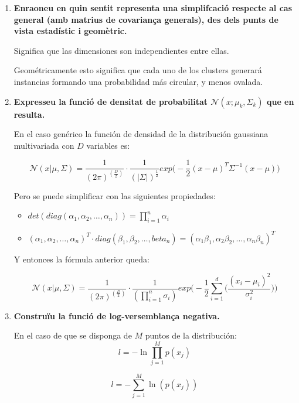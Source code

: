 \documentclass[a5paper]{article}
\begin{document}
\begin{enumerate}
\item \textbf{Enraoneu en quin sentit representa una simplifcació respecte al cas general (amb matrius de
covariança generals), des dels punts de vista estadístic i geomètric.
}

Significa que las dimensiones son independientes entre ellas.

Geométricamente esto significa que cada uno de los clusters generará instancias formando una probabilidad más circular, y menos ovalada.
\item \textbf{Expresseu la funció de densitat de probabilitat $\mathcal{N}(x; \mu_k, \Sigma_k)$ que en resulta.
}

En el caso genérico la función de densidad de la distribución gaussiana multivariada con $D$ variables es:

\begin{equation*}
\mathcal{N}(x|\mu,\Sigma) = \frac{1}{(2\pi)^{(\frac{D}{2})}} \cdot \frac{1}{(|\Sigma|)^{\frac{1}{2}}} exp\Bigg( -\frac{1}{2} (x - \mu)^T\Sigma^{-1}(x - \mu) \Bigg)
\end{equation*}

Pero se puede simplificar con las siguientes propiedades:
\begin{itemize}
\item $det( diag(\alpha_1,\alpha_2, \dots, \alpha_n) ) = \prod_{i = 1}^n \alpha_i$
\item $(\alpha_1,\alpha_2, \dots, \alpha_n)^T \cdot diag(\beta_1,\beta_2, \dots, beta_n) = (\alpha_1\beta_1, \alpha_2\beta_2, \dots, \alpha_n\beta_n)^T$
\end{itemize}

Y entonces la fórmula anterior queda:

\begin{equation*}
\mathcal{N}(x|\mu,\Sigma) = \frac{1}{(2\pi)^{(\frac{D}{2})}} \cdot \frac{1}{(\prod_{i = 1}^n \sigma_i)} exp\Bigg( -\frac{1}{2} \sum_{i = 1}^{d} \Big( \frac{(x_i - \mu_i)^2}{\sigma_i^2} \Big) \Bigg)
\end{equation*}
\item \textbf{Construïu la funció de log-versemblança negativa.
}

En el caso de que se disponga de $M$ puntos de la distribución:
\begin{equation*}
l = -\ln \prod_{j = 1}^{M} p(x_j) 
\end{equation*}

\begin{equation*}
l = -\sum_{j = 1}^{M} \ln(p(x_j)) 
\end{equation*}


\end{enumerate}
\end{document}
